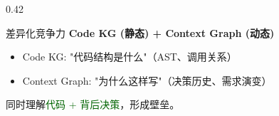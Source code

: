 \documentclass[aspectratio=169,10pt]{beamer}
\begin{document}
\begin{frame}
\begin{columns}[T]
\begin{column}{0.42\textwidth}
      \vspace{0.05cm}

      \begin{alertblock}{差异化竞争力}
        \scriptsize
        \textbf{Code KG (静态) + Context Graph (动态)}
        \begin{itemize}
            \item Code KG: "代码结构是什么"（AST、调用关系）
            \item Context Graph: "为什么这样写"（决策历史、需求演变）
        \end{itemize}
        同时理解\textcolor{darkgreen}{代码 + 背后决策}，形成壁垒。
      \end{alertblock}
    \end{column}
  \end{columns}
\end{frame}
\end{document}
